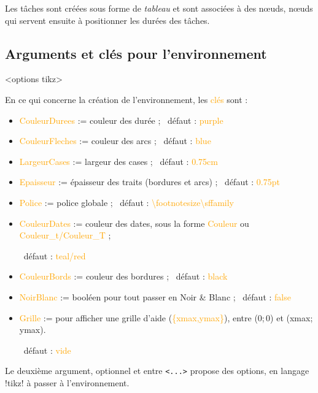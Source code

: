 \documentclass[french,a4paper,11pt]{article}
\newcommand\Cle[1]{{\small\sffamily\textlangle \textcolor{orange}{#1}\textrangle}}
\begin{document}
{{\begin{tipblock}
Les tâches sont créées sous forme de \textit{tableau} et sont associées à des nœuds, nœuds qui servent ensuite à positionner les durées des tâches.
\end{tipblock}

\pagebreak

\subsection{Arguments et clés pour l'environnement}

\begin{DemoCode}
\begin{GrapheMPM}[clés]<options tikz>
\end{GrapheMPM}
\end{DemoCode}

\begin{tipblock}
En ce qui concerne la création de l'environnement, les \Cle{clés} sont :

\begin{itemize}
	\item \Cle{CouleurDurees} := couleur des durée ; \hfill~défaut : \Cle{purple}
	\item \Cle{CouleurFleches} := couleur des arcs ; \hfill~défaut : \Cle{blue}
	\item \Cle{LargeurCases} := largeur des cases ; \hfill~défaut : \Cle{0.75cm}
	\item \Cle{Epaisseur} := épaisseur des traits (bordures et arcs) ; \hfill~défaut : \Cle{0.75pt}
	\item \Cle{Police} := police globale ; \hfill~défaut : \Cle{\textbackslash footnotesize\textbackslash sffamily}
	\item \Cle{CouleurDates} := couleur des dates, sous la forme \Cle{Couleur} ou \Cle{Couleur\_t/Couleur\_T} ;
	
	\hfill~défaut : \Cle{teal/red}
	\item \Cle{CouleurBords} := couleur des bordures ; \hfill~défaut : \Cle{black}
	\item \Cle{NoirBlanc} := booléen pour tout passer en Noir \&{} Blanc ; \hfill~défaut : \Cle{false}
	\item \Cle{Grille} := pour afficher une grille d'aide (\Cle{\{xmax,ymax\}}), entre (0;\,0) et (xmax;\,ymax).
	
	\hfill~défaut : \Cle{vide}
\end{itemize}

Le deuxième argument, optionnel et entre \texttt{<...>} propose des options, en langage \packagetex!tikz! à passer à l'environnement.
\end{tipblock}

}}
\end{document}

